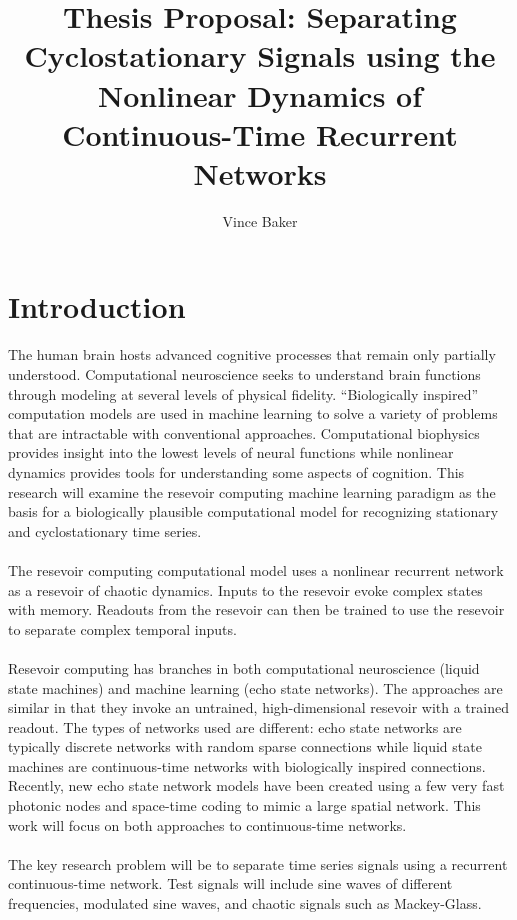 \documentclass[a4paper,11pt]{article}
\title{Thesis Proposal: Separating Cyclostationary Signals using the Nonlinear Dynamics of Continuous-Time Recurrent Networks}
\author{Vince Baker}
\numberwithin{equation}{section}
\begin{document}
\maketitle

\section{Introduction} 
The human brain hosts advanced cognitive processes that remain only partially understood.
Computational neuroscience seeks to understand brain functions through modeling at several levels of physical fidelity.
``Biologically inspired'' computation models are used in machine learning to solve a variety of problems that are intractable with conventional approaches.
Computational biophysics provides insight into the lowest levels of neural functions while nonlinear dynamics provides tools for understanding some aspects of cognition.
This research will examine the resevoir computing machine learning paradigm as the basis for a biologically plausible computational model for recognizing stationary and cyclostationary time series.
\\ \\
The resevoir computing computational model uses a nonlinear recurrent network as a resevoir of chaotic dynamics.
Inputs to the resevoir evoke complex states with memory.
Readouts from the resevoir can then be trained to use the resevoir to separate complex temporal inputs.
\\ \\
Resevoir computing has branches in both computational neuroscience (liquid state machines) and machine learning (echo state networks).
The approaches are similar in that they invoke an untrained, high-dimensional resevoir with a trained readout.
The types of networks used are different: echo state networks are typically discrete networks with random sparse connections while liquid state machines are continuous-time networks with biologically inspired connections.
Recently, new echo state network models have been created using a few very fast photonic nodes and space-time coding to mimic a large spatial network.
This work will focus on both approaches to continuous-time networks.
\\ \\
The key research problem will be to separate time series signals using a recurrent continuous-time network. 
Test signals will include sine waves of different frequencies, modulated sine waves, and chaotic signals such as Mackey-Glass.
\end{document}
